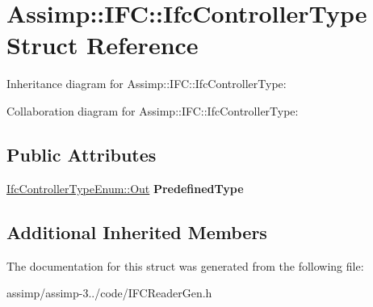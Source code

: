 \hypertarget{struct_assimp_1_1_i_f_c_1_1_ifc_controller_type}{\section{Assimp\+:\+:I\+F\+C\+:\+:Ifc\+Controller\+Type Struct Reference}
\label{struct_assimp_1_1_i_f_c_1_1_ifc_controller_type}
}


Inheritance diagram for Assimp\+:\+:I\+F\+C\+:\+:Ifc\+Controller\+Type\+:


Collaboration diagram for Assimp\+:\+:I\+F\+C\+:\+:Ifc\+Controller\+Type\+:
\subsection*{Public Attributes}
\begin{DoxyCompactItemize}
\item 
\hypertarget{struct_assimp_1_1_i_f_c_1_1_ifc_controller_type_a1a0abc765d963243056a415156e729ce}{\hyperlink{classboost_1_1shared__ptr}{Ifc\+Controller\+Type\+Enum\+::\+Out} {\bfseries Predefined\+Type}}\label{struct_assimp_1_1_i_f_c_1_1_ifc_controller_type_a1a0abc765d963243056a415156e729ce}

\end{DoxyCompactItemize}
\subsection*{Additional Inherited Members}


The documentation for this struct was generated from the following file\+:\begin{DoxyCompactItemize}
\item 
assimp/assimp-\/3../code/I\+F\+C\+Reader\+Gen.\+h\end{DoxyCompactItemize}
